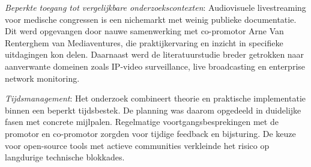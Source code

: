 \emph{Beperkte toegang tot vergelijkbare onderzoekscontexten}: Audiovisuele livestreaming voor medische congressen is een nichemarkt met weinig publieke documentatie. Dit werd opgevangen door nauwe samenwerking met co-promotor Arne Van Renterghem van Mediaventures, die praktijkervaring en inzicht in specifieke uitdagingen kon delen. Daarnaast werd de literatuurstudie breder getrokken naar aanverwante domeinen zoals IP-video surveillance, live broadcasting en enterprise network monitoring.

\emph{Tijdsmanagement}: Het onderzoek combineert theorie en praktische implementatie binnen een beperkt tijdsbestek. De planning was daarom opgedeeld in duidelijke fasen met concrete mijlpalen. Regelmatige voortgangsbesprekingen met de promotor en co-promotor zorgden voor tijdige feedback en bijsturing. De keuze voor open-source tools met actieve communities verkleinde het risico op langdurige technische blokkades.

